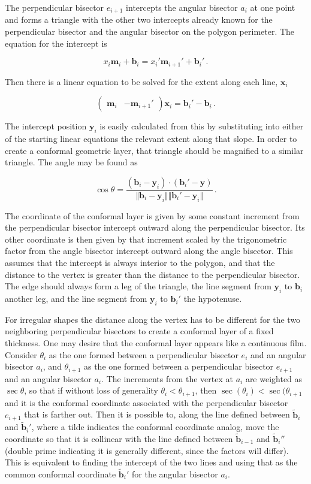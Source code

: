 \documentclass{article}
\begin{document}
The perpendicular bisector $e_{i+1}$ intercepts the angular bisector $a_i$ at one point and forms a triangle with the other two intercepts already known for the perpendicular bisector and the angular bisector on the polygon perimeter. The equation for the intercept is

$$ x_i \mathbf{m}_i + \mathbf{b}_{i} = x_i' \mathbf{m}_{i+1}' + \mathbf{b}_i'\,.$$

Then there is a linear equation to be solved for the extent along each line, $\mathbf{x}_i$

$$ \begin{pmatrix} \mathbf{m}_i & -\mathbf{m}_{i+1}' \end{pmatrix} \mathbf{x}_i = \mathbf{b}_i' - \mathbf{b}_i \,.$$

    The intercept position $\mathbf{y}_i$ is easily calculated from this by substituting into either of the starting linear equations the relevant extent along that slope. In order to create a conformal geometric layer, that triangle should be magnified to a similar triangle. The angle may be found as 

$$\cos\theta = \frac{ (\mathbf{b}_i - \mathbf{y}_i) \cdot (\mathbf{b}_i' - \mathbf{y}) }{ \Vert \mathbf{b}_i - \mathbf{y}_i \Vert \Vert \mathbf{b}_i' - \mathbf{y}_i \Vert } \,.  $$

The coordinate of the conformal layer is given by some constant increment from the perpendicular bisector intercept outward along the perpendicular bisector. Its other coordinate is then given by that increment scaled by the trigonometric factor from the angle bisector intercept outward along the angle bisector. This assumes that the intercept is always interior to the polygon, and that the distance to the vertex is greater than the distance to the perpendicular bisector. The edge should always form a leg of the triangle, the line segment from $\mathbf{y}_i$ to $\mathbf{b}_i$ another leg, and the line segment from $\mathbf{y}_i$ to $\mathbf{b}_i'$ the hypotenuse.

For irregular shapes the distance along the vertex has to be different for the two neighboring perpendicular bisectors to create a conformal layer of a fixed thickness. One may desire that the conformal layer appears like a continuous film. Consider $\theta_i$ as the one formed between a perpendicular bisector $e_i$ and an angular bisector $a_i$, and $\theta_{i+1}$ as the one formed between a perpendicular bisector $e_{i+1}$ and an angular bisector $a_i$. The increments from the vertex at $a_i$ are weighted as $\sec\theta$, so that if without loss of generality $\theta_i < \theta_{i+1}$, then $\sec(\theta_i) < \sec(\theta_{i+1}$ and it is the conformal coordinate associated with the perpendicular bisector $e_{i+1}$ that is farther out. Then it is possible to, along the line defined between $\tilde{\mathbf{b}}_i$ and $\tilde{\mathbf{b}}_i'$, where a tilde indicates the conformal coordinate analog, move the coordinate so that it is collinear with the line defined between $\tilde{\mathbf{b}}_{i-1}$ and $\tilde{\mathbf{b}}_i''$ (double prime indicating it is generally different, since the factors will differ). This is equivalent to finding the intercept of the two lines and using that as the common conformal coordinate $\tilde{\mathbf{b}}_i'$ for the angular bisector $a_i$. 
\end{document}

